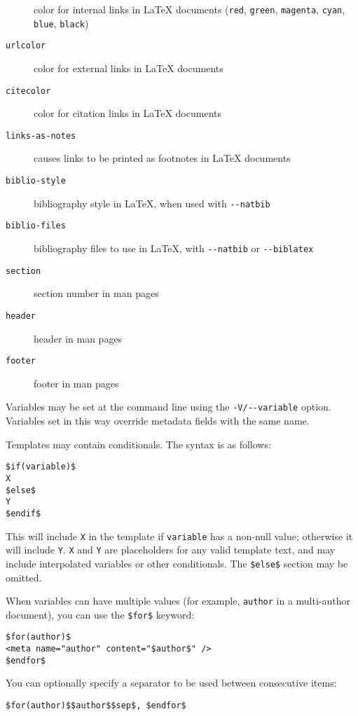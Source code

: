 \documentclass[]{article}
\begin{document}
\begin{description}
color for internal links in LaTeX documents (\texttt{red},
\texttt{green}, \texttt{magenta}, \texttt{cyan}, \texttt{blue},
\texttt{black})
\item[\texttt{urlcolor}]
color for external links in LaTeX documents
\item[\texttt{citecolor}]
color for citation links in LaTeX documents
\item[\texttt{links-as-notes}]
causes links to be printed as footnotes in LaTeX documents
\item[\texttt{biblio-style}]
bibliography style in LaTeX, when used with \texttt{-{}-natbib}
\item[\texttt{biblio-files}]
bibliography files to use in LaTeX, with \texttt{-{}-natbib} or
\texttt{-{}-biblatex}
\item[\texttt{section}]
section number in man pages
\item[\texttt{header}]
header in man pages
\item[\texttt{footer}]
footer in man pages
\end{description}

Variables may be set at the command line using the
\texttt{-V/-{}-variable} option. Variables set in this way override
metadata fields with the same name.

Templates may contain conditionals. The syntax is as follows:

\begin{verbatim}
$if(variable)$
X
$else$
Y
$endif$
\end{verbatim}

This will include \texttt{X} in the template if \texttt{variable} has a
non-null value; otherwise it will include \texttt{Y}. \texttt{X} and
\texttt{Y} are placeholders for any valid template text, and may include
interpolated variables or other conditionals. The \texttt{\$else\$}
section may be omitted.

When variables can have multiple values (for example, \texttt{author} in
a multi-author document), you can use the \texttt{\$for\$} keyword:

\begin{verbatim}
$for(author)$
<meta name="author" content="$author$" />
$endfor$
\end{verbatim}

You can optionally specify a separator to be used between consecutive
items:

\begin{verbatim}
$for(author)$$author$$sep$, $endfor$
\end{verbatim}
\end{document}
